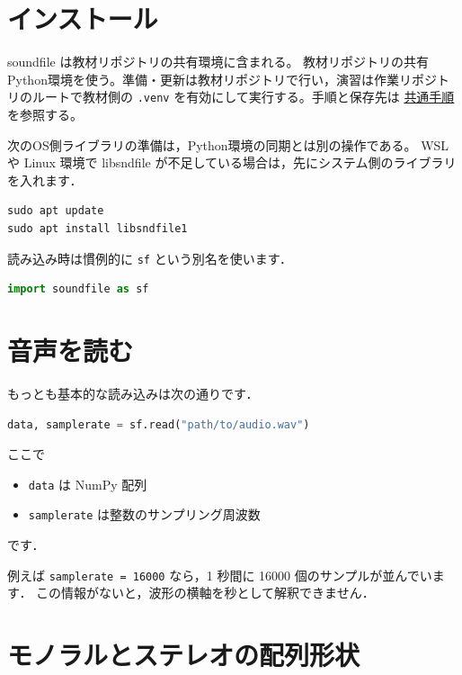 \section{インストール}

soundfile は教材リポジトリの共有環境に含まれる。
教材リポジトリの共有Python環境を使う。準備・更新は教材リポジトリで行い，演習は作業リポジトリのルートで教材側の \texttt{.venv} を有効にして実行する。手順と保存先は \href{https://github.com/ykinolab-tokai/signal-ml-training/blob/main/handouts/README.md}{共通手順}を参照する。

次のOS側ライブラリの準備は，Python環境の同期とは別の操作である。
WSL や Linux 環境で libsndfile が不足している場合は，先にシステム側のライブラリを入れます．

\begin{lstlisting}[style=codecell]
sudo apt update
sudo apt install libsndfile1
\end{lstlisting}

読み込み時は慣例的に \texttt{sf} という別名を使います．

\begin{lstlisting}[style=codecell,language=Python]
import soundfile as sf
\end{lstlisting}


\section{音声を読む}

もっとも基本的な読み込みは次の通りです．

\begin{lstlisting}[style=codecell,language=Python]
data, samplerate = sf.read("path/to/audio.wav")
\end{lstlisting}

ここで
\begin{itemize}
\item \texttt{data} は NumPy 配列
\item \texttt{samplerate} は整数のサンプリング周波数
\end{itemize}
です．

例えば \texttt{samplerate = 16000} なら，1 秒間に 16000 個のサンプルが並んでいます．
この情報がないと，波形の横軸を秒として解釈できません．


\section{モノラルとステレオの配列形状}

